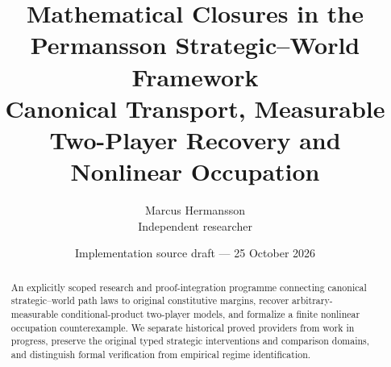 \documentclass[11pt]{article}
\title{Mathematical Closures in the Permansson Strategic--World Framework\\
\large Canonical Transport, Measurable Two-Player Recovery and Nonlinear Occupation}
\author{Marcus Hermansson\\Independent researcher}
\date{Implementation source draft --- 25 October 2026}
\begin{document}
\maketitle
\begin{center}\end{center}
\begin{abstract}
An explicitly scoped research and proof-integration programme connecting canonical strategic--world path laws to
original constitutive margins, recover arbitrary-measurable conditional-product
two-player models, and formalize a finite nonlinear occupation counterexample.
We separate historical proved providers from work in progress, preserve the
original typed strategic interventions and comparison domains, and distinguish
formal verification from empirical regime identification.
\end{abstract}
\tableofcontents







\appendix




\end{document}
